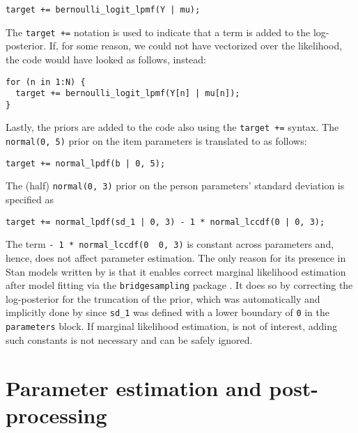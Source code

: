 \documentclass[
]{jss}
\begin{document}
\begin{verbatim}
target += bernoulli_logit_lpmf(Y | mu);
\end{verbatim}

The \texttt{target\ +=} notation is used to indicate that a term is
added to the log-posterior. If, for some reason, we could not have
vectorized over the likelihood, the code would have looked as follows,
instead:

\begin{verbatim}
for (n in 1:N) {
  target += bernoulli_logit_lpmf(Y[n] | mu[n]);
}
\end{verbatim}

Lastly, the priors are added to the  code also using the
\texttt{target\ +=} syntax. The \texttt{normal(0,\ 5)} prior on the item
parameters is translated to  as follows:

\begin{verbatim}
target += normal_lpdf(b | 0, 5);
\end{verbatim}

The (half) \texttt{normal(0,\ 3)} prior on the person parameters'
standard deviation is specified as

\begin{verbatim}
target += normal_lpdf(sd_1 | 0, 3) - 1 * normal_lccdf(0 | 0, 3);
\end{verbatim}

The term \texttt{-\ 1\ *\ normal\_lccdf(0\ \textbar{}\ 0,\ 3)} is
constant across parameters and, hence, does not affect parameter
estimation. The only reason for its presence in Stan models written by
 is that it enables correct marginal likelihood estimation
after model fitting via the \texttt{bridgesampling} package
\citep{bridgesampling}. It does so by correcting the log-posterior for
the truncation of the prior, which was automatically and implicitly done
by  since \texttt{sd\_1} was defined with a lower
boundary of \texttt{0} in the \texttt{parameters} block. If marginal
likelihood estimation, is not of interest, adding such constants is not
necessary and can be safely ignored.

\hypertarget{estimation}{%
\section{Parameter estimation and post-processing}\label{estimation}}
\end{document}
